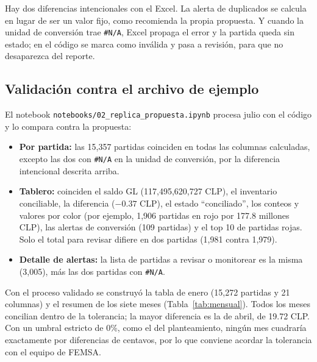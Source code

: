\documentclass[11pt,letterpaper]{article}
\begin{document}
Hay dos diferencias intencionales con el Excel. La alerta de duplicados se calcula en lugar de ser un valor fijo, como recomienda la propia propuesta. Y cuando la unidad de conversión trae \texttt{\#N/A}, Excel propaga el error y la partida queda sin estado; en el código se marca como inválida y pasa a revisión, para que no desaparezca del reporte.

\subsection{Validación contra el archivo de ejemplo}

El notebook \texttt{notebooks/02\_replica\_propuesta.ipynb} procesa julio con el código y lo compara contra la propuesta:

\begin{itemize}
  \item \textbf{Por partida:} las 15,357 partidas coinciden en todas las columnas calculadas, excepto las dos con \texttt{\#N/A} en la unidad de conversión, por la diferencia intencional descrita arriba.
  \item \textbf{Tablero:} coinciden el saldo GL (117,495,620,727 CLP), el inventario conciliable, la diferencia ($-0.37$ CLP), el estado ``conciliado'', los conteos y valores por color (por ejemplo, 1,906 partidas en rojo por 177.8 millones CLP), las alertas de conversión (109 partidas) y el top 10 de partidas rojas. Solo el total para revisar difiere en dos partidas (1,981 contra 1,979).
  \item \textbf{Detalle de alertas:} la lista de partidas a revisar o monitorear es la misma (3,005), más las dos partidas con \texttt{\#N/A}.
\end{itemize}

Con el proceso validado se construyó la tabla de enero (15,272 partidas y 21 columnas) y el resumen de los siete meses (Tabla~\ref{tab:mensual}). Todos los meses concilian dentro de la tolerancia; la mayor diferencia es la de abril, de 19.72 CLP. Con un umbral estricto de 0\%, como el del planteamiento, ningún mes cuadraría exactamente por diferencias de centavos, por lo que conviene acordar la tolerancia con el equipo de FEMSA.
\end{document}
